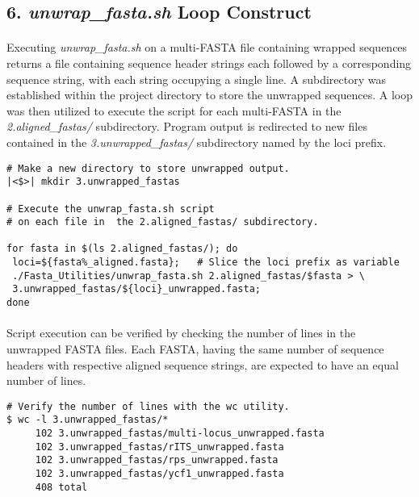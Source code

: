 \clearpage

\subsection*{6. \textit{unwrap\_fasta.sh} Loop Construct}

\paragraph{} Executing \textit{unwrap\_fasta.sh} on a multi-FASTA file containing wrapped sequences returns a file containing sequence header strings each followed by a corresponding sequence string, with each string occupying a single line.  A subdirectory was established within the project directory to store the unwrapped sequences.  A loop was then utilized to execute the script for each multi-FASTA in the \textit{2.aligned\_fastas/} subdirectory.  Program output is redirected to new files contained in the \textit{3.unwrapped\_fastas/} subdirectory named by the loci prefix.

\vspace*{30pt}

\begin{lstlisting}[caption={\textit{unwrap\_fasta.sh} Loop Contstruct}]
# Make a new directory to store unwrapped output.
|<$>| mkdir 3.unwrapped_fastas

# Execute the unwrap_fasta.sh script
# on each file in  the 2.aligned_fastas/ subdirectory.

for fasta in $(ls 2.aligned_fastas/); do
 loci=${fasta%_aligned.fasta};   # Slice the loci prefix as variable
 ./Fasta_Utilities/unwrap_fasta.sh 2.aligned_fastas/$fasta > \
 3.unwrapped_fastas/${loci}_unwrapped.fasta;
done
\end{lstlisting}

\vspace*{30pt}

\paragraph{} Script execution can be verified by checking the number of lines in the unwrapped FASTA files.  Each FASTA, having the same number of sequence headers with respective aligned sequence strings, are expected to have an equal number of lines.

\clearpage

\begin{lstlisting}[caption={Verify line count of unwrapped FASTA files}]
# Verify the number of lines with the wc utility.
$ wc -l 3.unwrapped_fastas/*
     102 3.unwrapped_fastas/multi-locus_unwrapped.fasta
     102 3.unwrapped_fastas/rITS_unwrapped.fasta
     102 3.unwrapped_fastas/rps_unwrapped.fasta
     102 3.unwrapped_fastas/ycf1_unwrapped.fasta
     408 total
\end{lstlisting}

